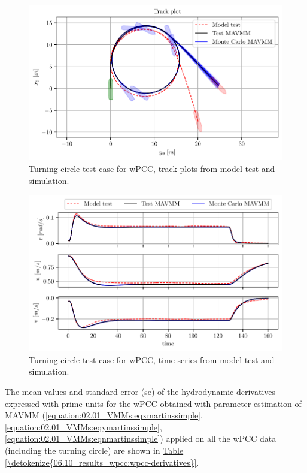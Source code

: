 \begin{figure}[!htb]
\centering
\includegraphics{kappa/images/10.pdf}
\caption{Turning circle test case for wPCC, track plots from model test and simulation.}\label{\detokenize{06.10_results_wpcc:fig-track-plot-testing-sim}}\end{figure}

\begin{figure}[!htb]
\centering
\includegraphics{kappa/images/11.pdf}
\caption{Turning circle test case for wPCC, time series from model test and simulation.}\label{\detokenize{06.10_results_wpcc:fig-testing-sim}}\end{figure}



The mean values and standard error (se) of the hydrodynamic derivatives expressed with prime units for the wPCC obtained with parameter estimation of MAVMM (\autoref{equation:02.01_VMMs:eqxmartinssimple},\autoref{equation:02.01_VMMs:eqymartinssimple}, \autoref{equation:02.01_VMMs:eqnmartinssimple}) applied on all the wPCC data (including the turning circle)  are shown in \hyperref[\detokenize{06.10_results_wpcc:wpcc-derivatives}]{Table \ref{\detokenize{06.10_results_wpcc:wpcc-derivatives}}}.

